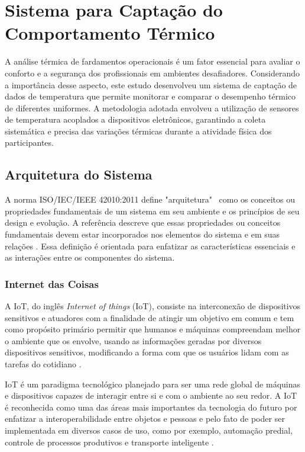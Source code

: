 \chapter{Sistema para Captação do Comportamento Térmico}
A análise térmica de fardamentos operacionais é um fator essencial para avaliar o conforto e a segurança dos profissionais em ambientes desafiadores. Considerando a importância desse aspecto, este estudo desenvolveu um sistema de captação de dados de temperatura que permite monitorar e comparar o desempenho térmico de diferentes uniformes. A metodologia adotada envolveu a utilização de sensores de temperatura acoplados a dispositivos eletrônicos, garantindo a coleta sistemática e precisa das variações térmicas durante a atividade física dos participantes.


\section{Arquitetura do Sistema}

A norma ISO/IEC/IEEE 42010:2011 define "arquitetura"~ como os conceitos ou propriedades fundamentais de um sistema em seu ambiente e os princípios de seu design e evolução. A referência descreve que essas propriedades ou conceitos fundamentais devem estar incorporados nos elementos do sistema e em suas relações \cite{ISO42010}. Essa definição é orientada para enfatizar as características essenciais e as interações entre os componentes do sistema.

\subsection{Internet das Coisas}

	A \acrlong{IoT}, do inglês \textit{Internet of things} (\acrshort{IoT}), consiste na interconexão de dispositivos sensitivos e atuadores com a finalidade de atingir um
	 objetivo em comum \cite{giusto2010internet} e tem como propósito primário permitir que humanos e máquinas compreendam melhor o ambiente que os envolve,
	  usando as informações geradas por diversos dispositivos sensitivos, modificando a forma com que os usuários lidam com as tarefas do cotidiano \cite{atzori2010internet}.
	
	  \tab \acrshort{IoT} é um paradigma tecnológico planejado para ser uma rede global de máquinas e dispositivos capazes de interagir entre si e com o ambiente ao
	 seu redor. A \acrshort{IoT} é reconhecida como uma das áreas mais importantes da tecnologia do futuro por enfatizar a interoperabilidade entre objetos e pessoas
	  e pelo fato de poder ser implementada em diversos casos de uso, como por exemplo, automação predial, controle de processos produtivos e transporte inteligente \cite{gubbi2013internet}.
	
